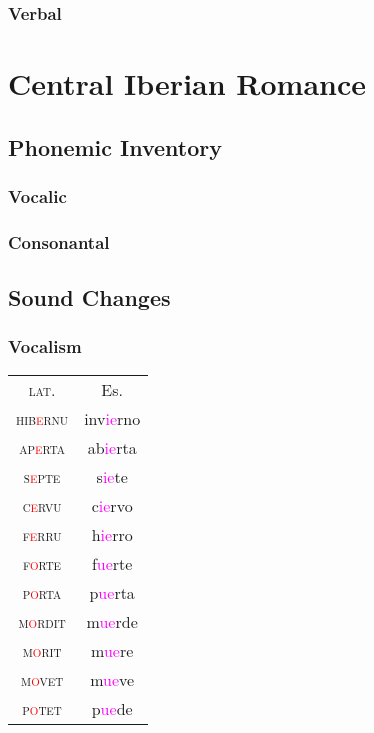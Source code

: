 \documentclass{report}
\begin{document}
\subsection{Verbal}

\chapter{Central Iberian Romance}


\section{Phonemic Inventory}

\subsection{Vocalic}

\subsection{Consonantal}

\section{Sound Changes}

\subsection{Vocalism}

\begin{tcolorbox}[title=Diphthongization]
  
\end{tcolorbox}

\begin{tabular}{c c}
  \textsc{lat.} & Es. \\
  \textsc{hib\textcolor{red}{e}rnu} & inv\textcolor{magenta}{ie}rno \\
  \textsc{ap\textcolor{red}{e}rta} & ab\textcolor{magenta}{ie}rta \\
  \textsc{s\textcolor{red}{e}pte} & s\textcolor{magenta}{ie}te \\
  \textsc{c\textcolor{red}{e}rvu} & c\textcolor{magenta}{ie}rvo \\
  \textsc{f\textcolor{red}{e}rru} & h\textcolor{magenta}{ie}rro \\
  \textsc{f\textcolor{red}{o}rte} & f\textcolor{magenta}{ue}rte \\
  \textsc{p\textcolor{red}{o}rta} & p\textcolor{magenta}{ue}rta \\
  \textsc{m\textcolor{red}{o}rdit} & m\textcolor{magenta}{ue}rde \\
  \textsc{m\textcolor{red}{o}rit} & m\textcolor{magenta}{ue}re \\
  \textsc{m\textcolor{red}{o}vet} & m\textcolor{magenta}{ue}ve \\
  \textsc{p\textcolor{red}{o}tet} & p\textcolor{magenta}{ue}de \\
\end{tabular}
\end{document}
